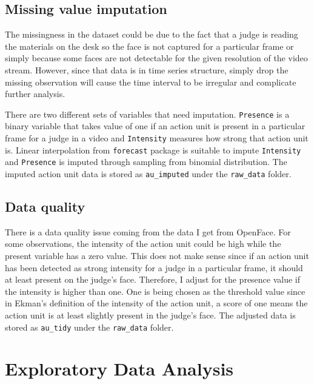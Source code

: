 \documentclass{monashthesis}
\begin{document}
\hypertarget{missing-value-imputation}{%
\section{Missing value imputation}\label{missing-value-imputation}}

The missingness in the dataset could be due to the fact that a judge is reading the materials on the desk so the face is not captured for a particular frame or simply because some faces are not detectable for the given resolution of the video stream. However, since that data is in time series structure, simply drop the missing observation will cause the time interval to be irregular and complicate further analysis.

There are two different sets of variables that need imputation. \texttt{Presence} is a binary variable that takes value of one if an action unit is present in a particular frame for a judge in a video and \texttt{Intensity} measures how strong that action unit is. Linear interpolation from \texttt{forecast} package is suitable to impute \texttt{Intensity} and \texttt{Presence} is imputed through sampling from binomial distribution. The imputed action unit data is stored as \texttt{au\_imputed} under the \texttt{raw\_data} folder.

\hypertarget{data-quality}{%
\section{Data quality}\label{data-quality}}

There is a data quality issue coming from the data I get from OpenFace. For some observations, the intensity of the action unit could be high while the present variable has a zero value. This does not make sense since if an action unit has been detected as strong intensity for a judge in a particular frame, it should at least present on the judge's face. Therefore, I adjust for the presence value if the intensity is higher than one. One is being chosen as the threshold value since in Ekman's definition of the intensity of the action unit, a score of one means the action unit is at least slightly present in the judge's face. The adjusted data is stored as \texttt{au\_tidy} under the \texttt{raw\_data} folder.

\hypertarget{exploratory-data-analysis}{%
\chapter{Exploratory Data Analysis}\label{exploratory-data-analysis}}
\end{document}
